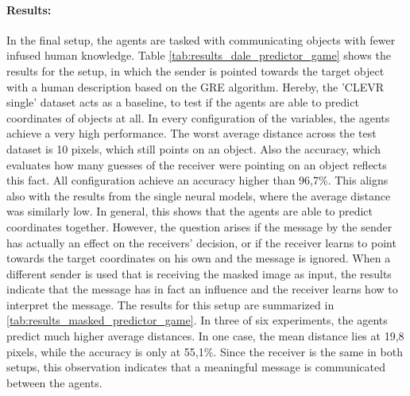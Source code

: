 \paragraph*{Results:}
In the final setup, the agents are tasked with communicating objects with fewer infused human knowledge.
Table \ref{tab:results_dale_predictor_game} shows the results for the setup, in which the sender is pointed towards the target object with a human description based on the GRE algorithm.
Hereby, the 'CLEVR single' dataset acts as a baseline, to test if the agents are able to predict coordinates of objects at all.
In every configuration of the variables, the agents achieve a very high performance.
The worst average distance across the test dataset is 10 pixels, which still points on an object.
Also the accuracy, which evaluates how many guesses of the receiver were pointing on an object reflects this fact.
All configuration achieve an accuracy higher than 96,7\%.
This aligns also with the results from the single neural models, where the average distance was similarly low.
In general, this shows that the agents are able to predict coordinates together.
However, the question arises if the message by the sender has actually an effect on the receivers' decision, or if the receiver learns to point towards the target coordinates on his own and the message is ignored.
When a different sender is used that is receiving the masked image as input, the results indicate that the message has in fact an influence and the receiver learns how to interpret the message.
The results for this setup are summarized in \ref{tab:results_masked_predictor_game}.
In three of six experiments, the agents predict much higher average distances.
In one case, the mean distance lies at 19,8 pixels, while the accuracy is only at 55,1\%.
Since the receiver is the same in both setups, this observation indicates that a meaningful message is communicated between the agents.

